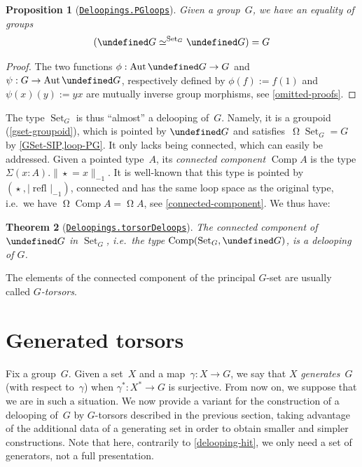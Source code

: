\documentclass[10pt,a4paper]{amsart}
\newtheorem{theorem}{Theorem}
\newtheorem{proposition}[theorem]{Proposition}
\theoremstyle{definition}
\newcommand{\freegroup}[1]{#1^*} %
\newcommand{\pres}[2]{\langle #1\ |\ #2\rangle} %
\newcommand{\pgroup}[1]{[#1]} %
\newcommand{\pt}[1]{\star_{#1}} %
\newcommand{\trunc}[2]{\|#2\|_{#1}} %
\newcommand{\ptrunc}[1]{\trunc{-1}{#1}} %
\newcommand{\trunq}[2]{|#2|_{#1}} %
\newcommand{\ptrunq}[1]{\trunq{-1}{#1}} %
\newcommand{\defd}{:=} %
\newcommand{\refl}[1]{\operatorname{refl}_{#1}} %
\newcommand{\Aut}{\operatorname{Aut}} %
\newcommand{\Comp}{\operatorname{Comp}} %
\newcommand{\Loop}{\operatorname{\Omega}} %
\let\P\undefined
\newcommand{\P}[1]{\operatorname{P}_{#1}} %
\newcommand{\Set}{\operatorname{Set}} %
\newcommand{\GSet}[1][G]{\Set_{#1}} %
\newcommand{\GSetEquiv}[3][G]{#2\simeq^{\GSet[#1]}#3} %
\newcommand{\ie}{i.e.~}
\newcommand{\agda}[2]{\href{https://smimram.github.io/generated-deloopings-agda/#1.html\##2}{\texttt{#1.#2}}}
\begin{document}
\begin{proposition}[\agda{Deloopings}{PGloops}]
  \label{loop-PG}
  Given a group~$G$, we have an equality of groups
  \[
    (\GSetEquiv{\P G}{\P G})=G
  \]
\end{proposition}
\begin{proof}
  The two functions
  $\phi:\Aut\P G\to G$ and $\psi:G\to\Aut\P G$, respectively defined by
  $\phi(f)\defd f(1)$ and $\psi(x)(y)\defd yx$ are mutually inverse group
  morphisms, see \cref{omitted-proofs}.
\end{proof}

The type $\GSet$ is thus ``almost'' a delooping of~$G$. Namely, it is a groupoid
(\cref{gset-groupoid}), which is pointed by $\P G$ and satisfies~$\Loop\GSet = G$ by
\cref{GSet-SIP,loop-PG}. It only lacks being connected, which can easily be
addressed. Given a pointed type~$A$, its \emph{connected component} $\Comp A$ is
the type $\Sigma(x:A).\ptrunc{\pt{}=x}$. It is well-known that this type is
pointed by $(\pt{},\ptrunq{\refl{}})$, connected and has the same loop space as
the original type, \ie we have $\Loop\Comp A=\Loop A$, see
\cref{connected-component}. We thus have:

\begin{theorem}[\agda{Deloopings}{torsorDeloops}]
  \label{PG-delooping}
  The connected component of~$\P G$ in $\GSet$, \ie the type
  $\Comp(\GSet,\P G)$, is a delooping of $G$.
\end{theorem}

\noindent
The elements of the connected component of the principal $G$-set are usually
called \emph{$G$-torsors}.

\section{Generated torsors}
\label{generated-torsors}
Fix a group~$G$. Given a set~$X$ and a map~$\gamma:X\to G$, we say that $X$ \emph{generates}~$G$ (with respect to~$\gamma$) when $\freegroup\gamma:\freegroup X\to G$ is surjective.
From now on, we suppose that we are in such a situation.
%
We now provide a variant for the construction of a delooping of~$G$ by $G$-torsors described in the
previous section, taking advantage of the additional data of a generating
set in order to obtain smaller and simpler constructions.
%
Note that here, contrarily to \cref{delooping-hit}, we only need a set of
generators, not a full presentation.
\end{document}
